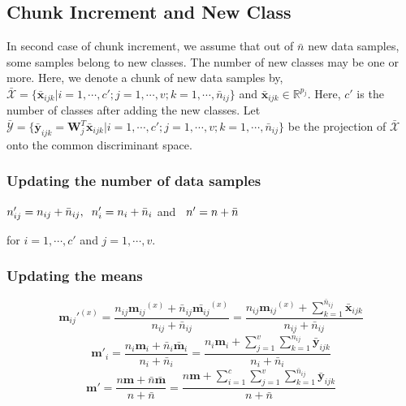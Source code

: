 \subsection{Chunk Increment and New Class}
\label{subs:MvIDA_ChkNC}
In second case of chunk increment, we assume that out of $\bar{n}$ new data samples, some samples belong to new classes. The number of new classes may be one or more. Here, we denote a chunk of new data samples by, $\bar{\mathcal{X}} = \{ \bar{\textbf{x}}_{ijk} | i=1,\cdots,c'; j=1,\cdots,v; k=1,\cdots,\bar{n}_{ij} \}$ and $\bar{\textbf{x}}_{ijk} \in \mathbb{R}^{p_j}$. Here, $c'$ is the number of classes after adding the new classes. Let $\bar{\mathcal{Y}} = \{ \bar{\textbf{y}}_{ijk} = \textbf{W}_j^T \bar{\textbf{x}}_{ijk} | i=1,\cdots,c'; j=1,\cdots,v; k=1,\cdots,\bar{n}_{ij} \}$ be the projection of $\bar{\mathcal{X}}$ onto the common discriminant space.



\subsubsection{Updating the number of data samples}
\label{ssubs:MvIDA_ChkNC_n}
\begin{center}
$n'_{ij} = n_{ij} + \bar{n}_{ij}, \hspace{0.2cm} n'_i = n_i + \bar{n}_i$ and $\hspace{0.2cm} n' = n + \bar{n}$
\end{center}
for $i=1,\cdots,c'$ and $j=1,\cdots,v$.



\subsubsection{Updating the means}
\label{ssubs:MvIDA_ChkNC_mu}
\begin{equation}
\label{eqn:4muij}
{\textbf{m}_{ij}'}^{(x)} = \frac{ n_{ij} {\textbf{m}_{ij}}^{(x)} + \bar{n}_{ij} \bar{\textbf{m}_{ij}}^{(x)}} {n_{ij} + \bar{n}_{ij}} = \frac{n_{ij} {\textbf{m}_{ij}}^{(x)} + \sum_{k=1}^{\bar{n}_{ij}} \bar{\textbf{x}}_{ijk}}{n_{ij} + \bar{n}_{ij}}
\end{equation}
\begin{equation}
\label{eqn:4mui}
\textbf{m}'_{i} = \frac{n_i \textbf{m}_{i} + \bar{n}_i \bar{\textbf{m}}_{i}}{n_i + \bar{n}_i} = \frac{n_i \textbf{m}_{i} + \sum_{j=1}^{v} \sum_{k=1}^{\bar{n}_{ij}} \bar{\textbf{y}}_{ijk}}{n_i + \bar{n}_i}
\end{equation}
\begin{equation}
\label{eqn:4mu}
\textbf{m}' = \frac{n \textbf{m} + \bar{n} \bar{\textbf{m}}}{n+\bar{n}} = \frac{n \textbf{m} + \sum_{i=1}^{c} \sum_{j=1}^{v} \sum_{k=1}^{\bar{n}_{ij}} \bar{\textbf{y}}_{ijk}}{n+\bar{n}}
\end{equation}



